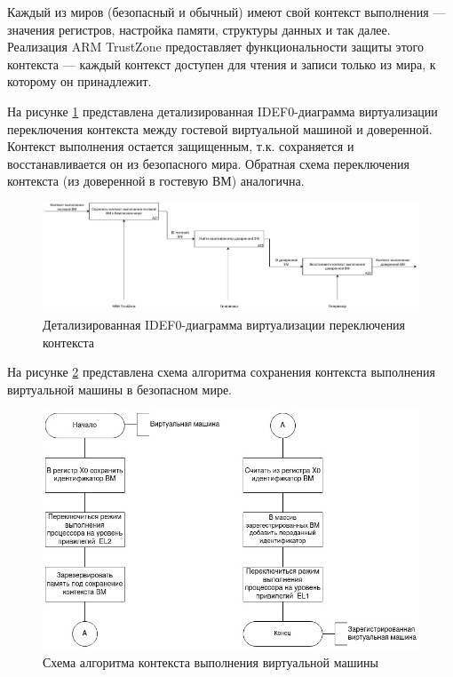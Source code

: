 Каждый из миров (безопасный и обычный) имеют свой контекст выполнения --- значения регистров, настройка памяти, структуры данных и так далее. Реализация ARM TrustZone предоставляет функциональности защиты этого контекста --- каждый контекст доступен для чтения и записи только из мира, к которому он принадлежит.

На рисунке \ref{fig:idef0-context-switch-2} представлена детализированная IDEF0-диаграмма виртуализации переключения контекста между гостевой виртуальной машиной и доверенной. Контекст выполнения остается защищенным, т.к. сохраняется и восстанавливается он из безопасного мира. Обратная схема переключения контекста (из доверенной в гостевую ВМ) аналогична.

\begin{figure}[h]
	\centering
	\includegraphics[width=\textwidth]{img/idef0-context-switch-2.pdf}
	\caption{Детализированная IDEF0-диаграмма виртуализации переключения контекста}
	\label{fig:idef0-context-switch-2}
\end{figure}

На рисунке \ref{fig:save-context-algo} представлена схема алгоритма сохранения контекста выполнения виртуальной машины в безопасном мире.

\begin{figure}[h]
	\centering
	\includegraphics[scale=0.6]{img/algo_2.jpg}
	\caption{Схема алгоритма контекста выполнения виртуальной машины}
	\label{fig:save-context-algo}
\end{figure}


